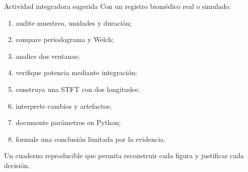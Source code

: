 \documentclass[
  ignorenonframetext,
  aspectratio=169,
  spanish,
]{beamer}
\providecommand{\tightlist}{%
  \setlength{\itemsep}{0pt}\setlength{\parskip}{0pt}}
\begin{document}
\begin{frame}{Actividad integradora sugerida}
  \protect{}\label{actividad-integradora-sugerida}
  Con un registro biomédico real o simulado:

  \begin{enumerate}
    \tightlist
    \item
          audite muestreo, unidades y duración;
    \item
          compare periodograma y Welch;
    \item
          analice dos ventanas;
    \item
          verifique potencia mediante integración;
    \item
          construya una STFT con dos longitudes;
    \item
          interprete cambios y artefactos;
    \item
          documente parámetros en Python;
    \item
          formule una conclusión limitada por la evidencia.
  \end{enumerate}

  \begin{tcolorbox}[enhanced jigsaw, arc=.35mm, bottomrule=.15mm, bottomtitle=1mm, breakable, colback=white, colbacktitle=quarto-callout-tip-color!10!white, colframe=quarto-callout-tip-color-frame, coltitle=black, left=2mm, leftrule=.75mm, opacityback=0, opacitybacktitle=0.6, rightrule=.15mm, title=\textcolor{quarto-callout-tip-color}{\faLightbulb}\hspace{0.5em}{Producto esperado}, titlerule=0mm, toprule=.15mm, toptitle=1mm]

    Un cuaderno reproducible que permita reconstruir cada figura y
    justificar cada decisión.

  \end{tcolorbox}
\end{frame}
\end{document}
